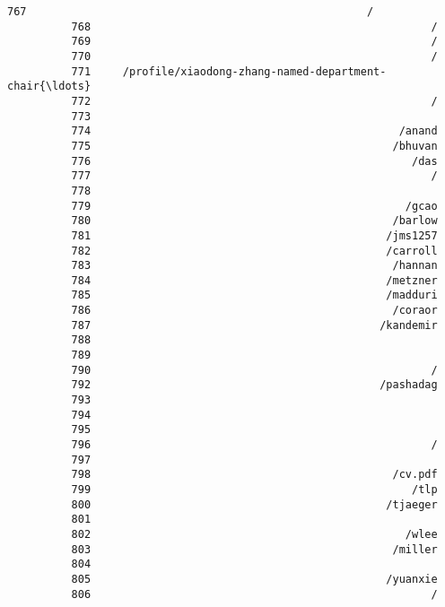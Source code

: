 \documentclass[11pt]{article}
\begin{document}
\begin{Verbatim}[commandchars=\\\{\}]
          767                                                     /
          768                                                     /
          769                                                     /
          770                                                     /
          771     /profile/xiaodong-zhang-named-department-chair{\ldots}
          772                                                     /
          773                                                      
          774                                                /anand
          775                                               /bhuvan
          776                                                  /das
          777                                                     /
          778                                                      
          779                                                 /gcao
          780                                               /barlow
          781                                              /jms1257
          782                                              /carroll
          783                                               /hannan
          784                                              /metzner
          785                                              /madduri
          786                                               /coraor
          787                                             /kandemir
          788                                                      
          789                                                      
          790                                                     /
          792                                             /pashadag
          793                                                      
          794                                                      
          795                                                      
          796                                                     /
          797                                                      
          798                                               /cv.pdf
          799                                                  /tlp
          800                                              /tjaeger
          801                                                      
          802                                                 /wlee
          803                                               /miller
          804                                                      
          805                                              /yuanxie
          806                                                     /

\end{Verbatim}
\end{document}
